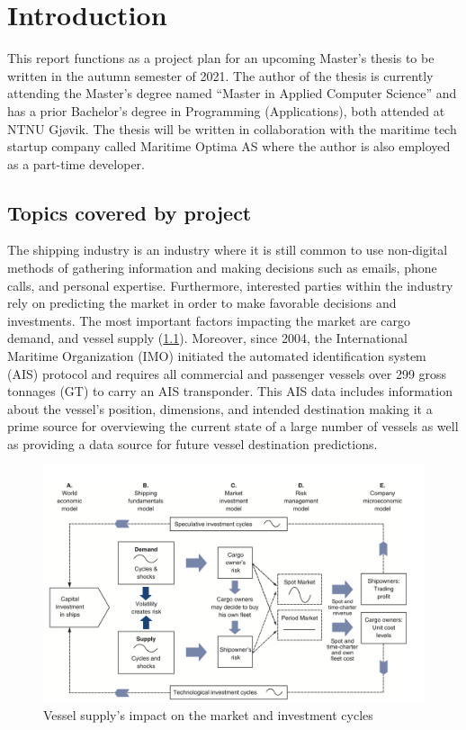 \chapter{Introduction}

This report functions as a project plan for an upcoming Master’s thesis to be written in the autumn semester of 2021. The author of the thesis is currently attending the Master’s degree named “Master in Applied Computer Science” and has a prior Bachelor’s degree in Programming (Applications), both attended at NTNU Gjøvik. The thesis will be written in collaboration with the maritime tech startup company called Maritime Optima AS where the author is also employed as a part-time developer.

\section{Topics covered by project}

The shipping industry is an industry where it is still common to use non-digital methods of gathering information and making decisions such as emails, phone calls, and personal expertise. Furthermore, interested parties within the industry rely on predicting the market in order to make favorable decisions and investments. The most important factors impacting the market are cargo demand, and vessel supply (\cref{fig:maritime_economics}). Moreover, since 2004, the International Maritime Organization (IMO) initiated the automated identification system (AIS) protocol and requires all commercial and passenger vessels over 299 gross tonnages (GT) to carry an AIS transponder. This AIS data includes information about the vessel’s position, dimensions, and intended destination making it a prime source for overviewing the current state of a large number of vessels as well as providing a data source for future vessel destination predictions.

\begin{figure}[htbp]  %
    \centering
    \includegraphics[width=.89\textwidth]{figures/investment_cycle}
    \caption{Vessel supply’s impact on the market and investment cycles \parencite{stopford2008}}
    \label{fig:maritime_economics}
\end{figure}

